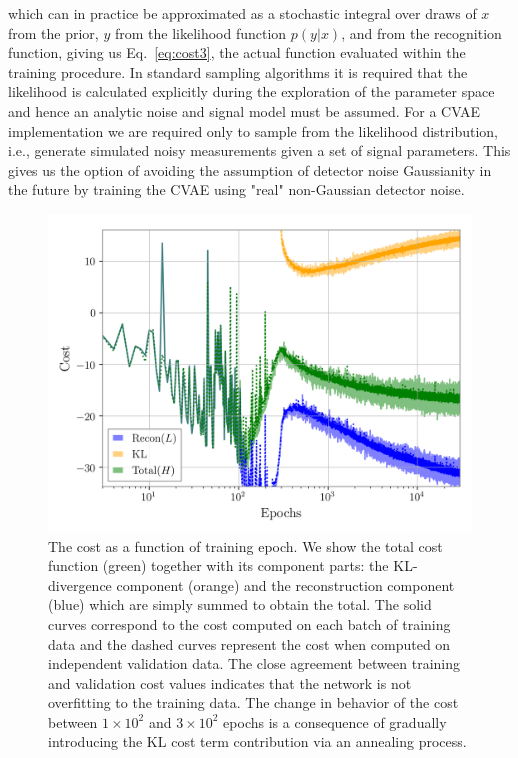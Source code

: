 \documentclass[%
showpacs,
nofootinbib,
 amsmath,amssymb,
 aps,
 twocolumn,
 prl,
 reprint,
floatfix,
]{revtex4-1}
\begin{document}
%
which can in practice be approximated as a stochastic integral over draws of
$x$ from the prior, $y$ from the likelihood function $p(y|x)$, and from the
recognition function, giving us Eq.~\ref{eq:cost3}, the actual function
evaluated within the training procedure. In standard sampling algorithms it is
required that the likelihood is calculated explicitly during the exploration of
the parameter space and hence an analytic noise and signal model must be
assumed. For a \ac{CVAE} implementation we are required only to sample from
the likelihood distribution, i.e., generate simulated noisy measurements given a
set of signal parameters. This gives us the option of avoiding the assumption
of detector noise Gaussianity in the future by training the \ac{CVAE} using "real"
non-Gaussian detector noise.

%
%
\begin{figure}
    \includegraphics[width=\columnwidth]{inv_losses_log.png}
\caption{\label{fig:loss_log} The cost as a function of training epoch.
We show the total cost function (green) together with its component parts:
the \ac{KL}-divergence component (orange) and the reconstruction component
(blue) which are simply summed to obtain the total. The solid curves correspond
to the cost computed on each batch of training data and the dashed curves
represent the cost when computed on independent validation data. The close
agreement between training and validation cost values indicates that the
network is not overfitting to the training data. The change in behavior of the
cost between $1\times10^2$ and $3\times10^2$ epochs is a consequence of gradually
introducing the \ac{KL} cost term contribution via an annealing process.} 
\end{figure}
\end{document}
